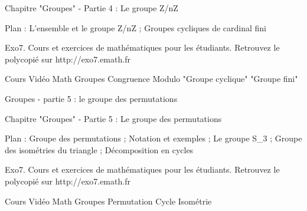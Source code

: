 Chapitre "Groupes" - Partie 4 : Le groupe Z/nZ

Plan : L'ensemble et le groupe Z/nZ ; 
Groupes cycliques de cardinal fini

Exo7. Cours et exercices de mathématiques pour les étudiants.
Retrouvez le polycopié sur http://exo7.emath.fr


Cours Vidéo Math Groupes Congruence Modulo "Groupe cyclique" "Groupe fini"



Groupes - partie 5 : le groupe des permutations



Chapitre "Groupes" - Partie 5 : Le groupe des permutations

Plan : Groupe des permutations ; Notation et exemples ;
Le groupe S_3 ; Groupe des isométries du triangle ;
Décomposition en cycles

Exo7. Cours et exercices de mathématiques pour les étudiants.
Retrouvez le polycopié sur http://exo7.emath.fr


Cours Vidéo Math Groupes Permutation Cycle Isométrie

